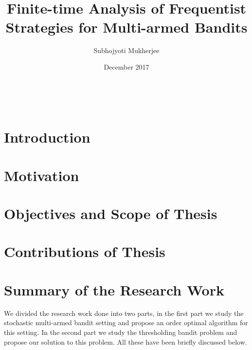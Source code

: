 \documentclass[MS,synopsis]{iitmdiss}
\title{Finite-time Analysis of Frequentist Strategies for Multi-armed Bandits}
\author{Subhojyoti Mukherjee}
\date{December 2017}
\begin{document}
\maketitle

\newpage
\
\thispagestyle{empty}
\clearpage

\setcounter{page}{1}



\section{Introduction}
\label{synopsis:intro}


\section{Motivation}
\label{synopsis:motivation}


\section{Objectives and Scope of Thesis}
\label{synopsis:objThesis}


\section{Contributions of Thesis}
\label{synopsis:contriThesis}


%
%

\section{Summary of the Research Work}

We divided the research work done into two parts, in the first part we study the stochastic multi-armed bandit setting and propose an order optimal algorithm for this setting. In the second part we study the thresholding bandit problem and propose our solution to this problem. All these have been briefly discussed below.

\end{document}

